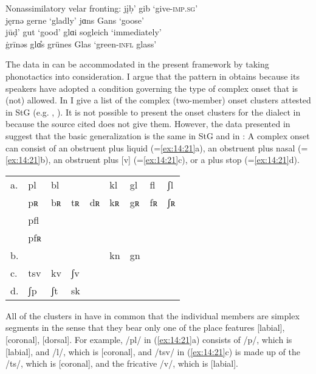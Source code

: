 \ea%
\label{ex:14:20}Nonassimilatory velar fronting:
\ea\label{ex:14:20a} j\k{i}ḅ’ \tab gib \tab ‘give-\textsc{imp}.\textsc{sg}’\\
    jęrnə \tab gerne \tab ‘gladly’
\ex\label{ex:14:20b} jɑns \tab Gans \tab ‘goose’\\
    jūḍ’ \tab gut \tab ‘good’
\ex\label{ex:14:20c} glɑi \tab sogleich \tab ‘immediately’\\
    \.{g}rīnəs glɑ̊s \tab grünes Glas \tab ‘green-\textsc{infl} glass’
    \z
\z 

The data in  can be accommodated in the present framework by taking phonotactics into consideration. I argue that the pattern in  obtains because its speakers have adopted a condition governing the type of complex onset that is (not) allowed. In  I give a list of the complex (two-member) onset clusters attested in StG (e.g. \citealt{Hall1992}, \citealt{Wiese1996a}). It is not possible to present the onset clusters for the dialect in  because the source cited does not give them. However, the data presented in \citet{Kieser1963} suggest that the basic generalization is the same in StG and in : A complex onset can consist of an obstruent plus liquid (=\ref{ex:14:21}a), an obstruent plus nasal (=\ref{ex:14:21}b), an obstruent plus [v] (=\ref{ex:14:21}c), or a  plus stop (=\ref{ex:14:21}d).\largerpage[2]

\ea%
\label{ex:14:21}\begin{tabular}[t]{@{} *{9}{l} @{}} 
a. & pl  & bl &     &    & kl & gl & fl & ʃl \\
   & pʀ  & bʀ & tʀ  & dʀ & kʀ & gʀ & fʀ & ʃʀ \\
   & pfl &    &     &    &    &    &    &    \\
   & pfʀ &    &     &    &    &    &    &    \\
b. &     &    &     &    & kn & gn \\
c. & tsv & kv & ʃv       \\
d. & ʃp  & ʃt & sk       \\
\end{tabular}
\z 

All of the clusters in  have in common that the individual members are simplex segments in the sense that they bear only one of the place features [labial], [coronal], [dorsal]. For example, /pl/ in (\ref{ex:14:21}a) consists of /p/, which is [labial], and /l/, which is [coronal], and /tsv/ in (\ref{ex:14:21}c) is made up of the  /ts/, which is [coronal], and the fricative /v/, which is [labial].

